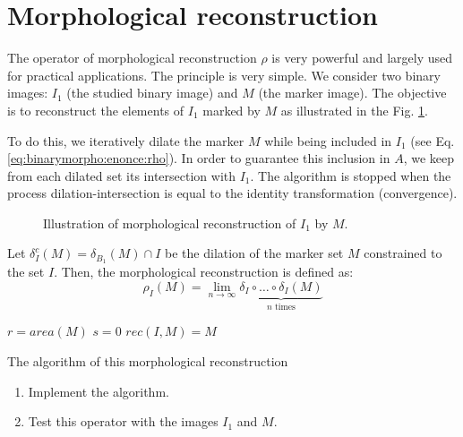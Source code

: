 \section{Morphological reconstruction}
The operator of morphological reconstruction $\rho$ is very powerful and largely used for practical applications.
The principle is very simple. We consider two binary images: $I_1$ (the studied binary image) and $M$ (the marker image).
The objective is to reconstruct the elements of $I_1$ marked by $M$ as illustrated in the Fig. \ref{fig:morpho:reconstruction}.

To do this, we iteratively dilate the marker $M$ while being included in $I_1$ (see Eq.\ref{eq:binarymorpho:enonce:rho}).
In order to guarantee this inclusion in $A$, we keep from each dilated set its intersection with $I_1$.
The algorithm is stopped when the process dilation-intersection is equal to the identity transformation (convergence).

\begin{figure}[htbp]
\centering\caption{Illustration of morphological reconstruction of $I_1$ by $M$.}%
\hspace{.5cm}
\hspace{.5cm}
%
\label{fig:morpho:reconstruction}%
\end{figure}

Let $\delta^c_I(M)= \delta_{B_1}(M) \cap I$ be the dilation of the marker set $M$ constrained to the set $I$. Then, the morphological reconstruction is defined as:
\begin{equation}\rho_I(M) = \lim_{n\rightarrow \infty} \underbrace{\delta_I \circ \ldots \circ \delta_I(M)}_{n \textrm{ times}}
 \label{eq:binarymorpho:enonce:rho}
\end{equation}



\begin{algorithm}[H]
\SetAlgoLined
{}
$r=area(M)$\;
$s=0$\;
$rec(I,M)=M$\;
\caption{The algorithm of this morphological reconstruction}
\end{algorithm}

\begin{qbox}
\begin{enumerate}
\item Implement the algorithm.
\item Test this operator with the images $I_1$ and $M$.
\end{enumerate}
\end{qbox}

